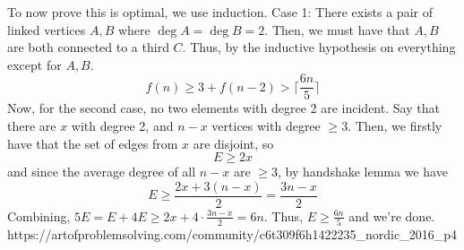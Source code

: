 \documentclass[a4paper]{article}
\begin{document}
\begin{question*}{}
{        To now prove this is optimal, we use induction. Case 1: There exists a pair of linked vertices $A,B$ where $\deg A = \deg B = 2$. Then, we must have that $A,B$ are both connected to a third $C$. Thus, by the inductive hypothesis on everything except for $A,B$.
        \[f(n) \geq 3 + f(n-2) > \lceil \frac{6n}{5}\rceil\]Now, for the second case, no two elements with degree 2 are incident. Say that there are $x$ with degree 2, and $n-x$ vertices with degree $\geq 3$. Then, we firstly have that the set of edges from $x$ are disjoint, so
        \[E\geq 2x\]and since the average degree of all $n-x$ are $\geq 3$, by handshake lemma we have
        \[E\geq \frac{2x+3(n-x)}{2}=\frac{3n-x}{2}\]Combining, $5E = E+4E\geq 2x + 4\cdot \frac{3n-x}{2} = 6n$. Thus, $E\geq \frac{6n}{5}$ and we're done.
        }{%
        https://artofproblemsolving.com/community/c6t309f6h1422235_nordic_2016_p4
    }


\end{question*}
\end{document}
